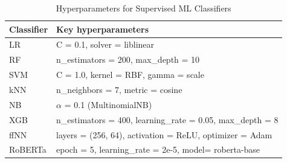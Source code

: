 \begin{table}
    \centering
    \caption{Hyperparameters for Supervised ML Classifiers}
    \label{tab:ml-hyperparameters}
    \setlength{\tabcolsep}{3pt} %
        \begin{tabularx}{\columnwidth}{l X}
            \toprule
            Classifier          & Key hyperparameters                                        \\
            \midrule
            \ac{LR} & C = 0.1, solver = liblinear                      \\
            \ac{RF}       & n\_estimators = 200, max\_depth = 10                       \\
            \ac{SVM} & C = 1.0, kernel = RBF, gamma = scale              \\
            \ac{kNN} & n\_neighbors = 7, metric = cosine                          \\
            \ac{NB}         & $\alpha$ = 0.1 (MultinomialNB)                    \\
            \ac{XGB}             & n\_estimators = 400, learning\_rate = 0.05, max\_depth = 8 \\
            \ac{ffNN}     & layers = (256, 64), activation = ReLU, optimizer = Adam    \\
            RoBERTa & epoch = 5, learning\_rate = 2e-5, model= roberta-base\\  
            \bottomrule
        \end{tabularx}
\end{table}
